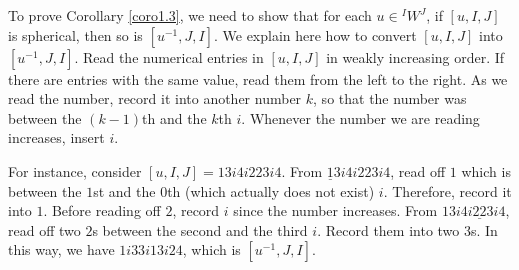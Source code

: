\documentclass[12pt]{amsart}
\theoremstyle{definition}
\theoremstyle{remark}
\begin{document}
To prove Corollary \ref{coro1.3}, we need to show that for each $u \in {}^I W^J$, if $[u,I,J]$ is spherical, then so is $[u^{-1}, J, I]$. We explain here how to convert $[u,I,J]$ into $[u^{-1},J,I]$. Read the numerical entries in $[u,I,J]$ in weakly increasing order. If there are entries with the same value, read them from the left to the right. As we read the number, record it into another number $k$, so that the number was between the $(k-1)$th and the $k$th $i$. Whenever the number we are reading increases, insert $i$.

For instance, consider $[u,I,J] = 13i4i223i4$. From $\underline{1}3i4i223i4$, read off $1$ which is between the $1$st and the $0$th (which actually does not exist) $i$. Therefore, record it into $1$. Before reading off $2$, record $i$ since the number increases. From $13i4i\underline{22}3i4$, read off two $2$s between the second and the third $i$. Record them into two $3$s. In this way, we have $1i33i13i24$, which is $[u^{-1}, J, I]$.
\end{document}
